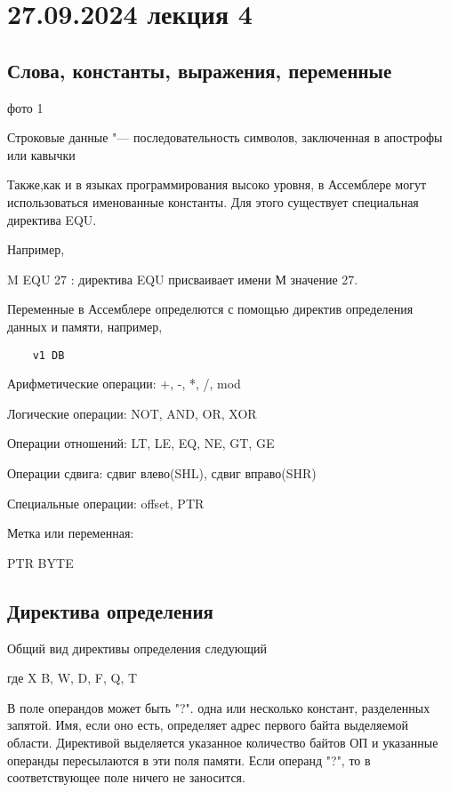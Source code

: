 \section{27.09.2024 лекция 4}
\subsection{Слова, константы, выражения, переменные}
фото 1

Строковые данные "--- последовательность символов, заключенная  в апострофы или кавычки

Также,как и в языках программирования высоко уровня, в Ассемблере могут использоваться именованные константы. Для этого существует специальная директива EQU.

Например,

M EQU 27 : директива EQU присваивает имени М значение 27.

Переменные в Ассемблере определются с помощью директив определения данных и памяти, например,

\begin{verbatim}
    v1 DB
\end{verbatim}

Арифметические операции: +, -, *, /, mod

Логические операции: NOT, AND, OR, XOR

Операции отношений: LT, LE, EQ, NE, GT, GE

Операции сдвига: сдвиг влево(SHL), сдвиг вправо(SHR)

Специальные операции: offset, PTR

Метка или переменная:

PTR
BYTE 


\subsection{Директива определения}

Общий вид директивы определения следующий

где X B, W, D, F, Q, T 

В поле операндов может быть "?". одна или несколько констант, разделенных запятой. Имя, если оно есть, определяет адрес первого байта выделяемой области. Директивой выделяется указанное количество байтов ОП и указанные операнды пересылаются в эти поля памяти. Если операнд "?", то в соответствующее поле ничего не заносится.

